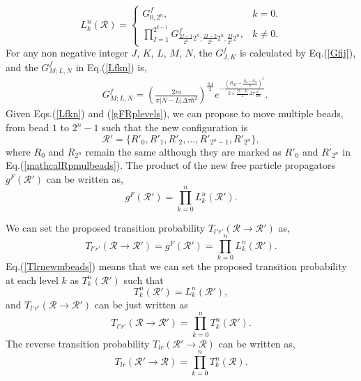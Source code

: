 \documentclass[12pt,letterpaper,UTF8]{report}
\begin{document}
\begin{equation}
 L^n_k(\mathcal{R}) =
\begin{cases}
G^f_{0, 2^n},  &  k = 0. \\
 \prod\limits_{I=1}^{2^{k-1}}  G^f_{\frac{2I-1}{2^k}2^{n}; \frac{2I-2}{2^k}2^{n}, \frac{2I}{2^k}2^{n}}  , & k \neq 0
.\end{cases} \label{Lfkn}
\end{equation}
For any non negative integer $J$, $K$, $L$, $M$, $N$, the $G^f_{J, K}$ is calculated by Eq.(\ref{Gfij}), and the $G^f_{M;L,N}$ in Eq.(\ref{Lfkn}) is,
\begin{align}
& G^f_{M;L,N} =
\left( \frac{2m}{\pi |N-L| \Delta \tau \hbar^2} \right)^{\frac{3A}{2}}
 e^{  -   \frac{ \left(  R_{M}  - \frac{ R_{L} + R_{N}   }{2}   \right)^2   }   {2\times \frac{|N-L|}{2}\Delta \tau \frac{\hbar^2}{2m}   }    }.
\label{gFRplevels}
\end{align}
Given Eqs.(\ref{Lfkn}) and (\ref{gFRplevels}), we can propose to move multiple beads, from bead $1$ to $2^n-1$ such that the new configuration is
\begin{equation}
\mathcal{R}'=\{R'_0, R'_1, R'_2, ..., R'_{2^n-1}, R'_{2^n} \},  \label{mathcalRpmulbeads}
\end{equation}
where $R_0$ and $R_{2^n}$ remain the same although they are marked as $R'_0$ and $R'_{2^n}$ in Eq.(\ref{mathcalRpmulbeads}). The product of the new free particle propagators $g^F(\mathcal{R}')$ can be written as,
\begin{equation}
g^F(\mathcal{R}') = \prod_{k=0}^{n} L^n_k(\mathcal{R}') . \label{gFRp}
\end{equation}

We can set the proposed transition probability $T_{l'r'}(\mathcal{R} \rightarrow \mathcal{R}')$ as,
\begin{equation}
T_{l'r'}(\mathcal{R} \rightarrow \mathcal{R}') = g^F(\mathcal{R}') = \prod_{k=0}^{n} L^n_k(\mathcal{R}').
 \label{Tlrnewmbeads}
\end{equation}
Eq.(\ref{Tlrnewmbeads}) means that we can set the proposed transition probability at each level $k$ as $T^n_k(\mathcal{R}')$ such that
\begin{equation}
T^n_k(\mathcal{R}') =  L^n_k(\mathcal{R}'),
 \label{Tlrnewmbeadslevelk}
\end{equation}
and $T_{l'r'}(\mathcal{R} \rightarrow \mathcal{R}')$ can be just written as
\begin{equation}
T_{l'r'}(\mathcal{R} \rightarrow \mathcal{R}') = \prod_{k=0}^{n} T^n_k(\mathcal{R}').
 \label{Tlrnewmbeadslbl}
\end{equation}
The reverse transition probability $T_{lr}(\mathcal{R}' \rightarrow \mathcal{R})$ can be written as,
\begin{equation}
T_{lr}(\mathcal{R}' \rightarrow \mathcal{R}) =
\prod_{k=0}^{n} T^n_k(\mathcal{R}) .
 \label{Tlroldmbeadslbl}
\end{equation}
\end{document}
